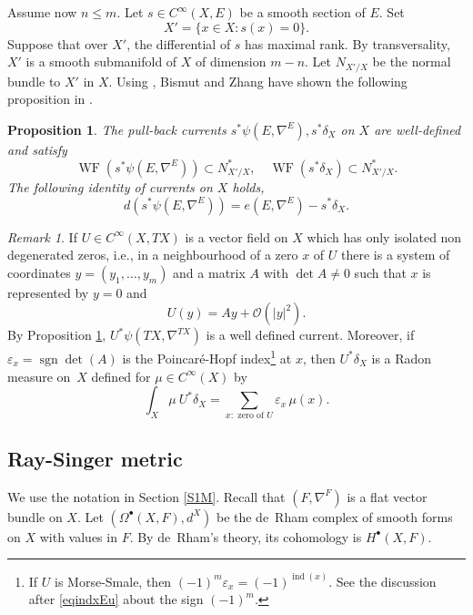 \documentclass[11pt]{article}
\newcommand{\ie}{i.e.,\xspace}
\numberwithin{equation}{section}
\newcommand{\sbullet}{{\scriptscriptstyle\bullet}}
\let\mathcal\mathscr
\theoremstyle{plain}
\newtheorem{prop}[lem]{Proposition}
\theoremstyle{definition}
\theoremstyle{remark}
\newtheorem{re}[lem]{Remark}
\newcommand{\cO}{\mathcal{O}}
\DeclareMathOperator{\ind}{ind}
\DeclareMathOperator{\sgn}{sgn}
\DeclareMathOperator{\WF}{WF}
\let\l\leqslant
\let\e\varepsilon
\begin{document}
Assume now $n\l m$. Let $s\in C^{\infty}(X,E)$ be a smooth section of $E$. Set
\begin{equation}\label{eqX0}
X'=\{x\in X:s(x)=0\}.
\end{equation}
Suppose that over $X'$, the differential of $s$ has maximal rank. By transversality,
$X'$ is a smooth submanifold of $X$ of dimension $m-n$. Let $N_{X'/X}$ be the normal bundle to $X'$ in $X$. Using \cite[Th.\,8.2.4]{HormanderBook1}, Bismut and Zhang have shown the following proposition in \cite[Rem.\,3.8]{BZ92}.

\begin{prop}\label{PropBZ38}
The pull-back currents $s^{*}\psi(E,\nabla^{E}),
s^{*}\delta_{X}$ on $X$ are well-defined and satisfy
\begin{equation}\label{eqWFsd}
\WF(s^{*}\psi(E,\nabla^{E}))\subset N_{X'/X}^{*},\quad\WF(s^{*}\delta_{X})\subset N^{*}_{X'/X}.
\end{equation}
The following identity of currents on $X$ holds,
\begin{equation}\label{eqsphi}
d(s^{*}\psi(E,\nabla^{E}))=e(E,\nabla^{E})-s^{*}\delta_{X}.
\end{equation}
\end{prop}

\begin{re}\label{reBZ38}
If $U\in C^{\infty}(X,TX)$ is a vector field on $X$ which has only isolated non degenerated
zeros, \ie in a neighbourhood of a zero $x$ of $U$ there is a
system of coordinates $y=(y_{1},\ldots,y_{m})$ and a matrix
$A$ with $\det
A\neq0$ such that $x$ is represented by $y=0$ and
\begin{equation*}\label{eqU=Ay}
U(y)=Ay+\cO(|y|^{2}).
\end{equation*}
By Proposition \ref{PropBZ38}, $U^{*}\psi(TX,\nabla^{TX})$ is a well
defined current. Moreover, if $\e_{x}=\sgn\det(A)$ is the Poincaré-Hopf
index\footnote{If $U$ is Morse-Smale, then $(-1)^{m}\e_{x}=(-1)^{\ind(x)}.$ See the discussion
after \eqref{eqindxEu} about the sign $(-1)^{m}$.} at $x$, then
$U^{*}\delta_{X}$ is a Radon measure on~$X$ defined for $\mu\in
C^{\infty}(X)$ by
\begin{equation}\label{eqUindd}
\int_{X}\mu \ U^{*}\delta_{X}=\sum_{x:\text{ zero of }U}\e_{x}\,\mu(x).
\end{equation}
\end{re}

\subsection{Ray-Singer metric}\label{sRS}
We use the notation in Section \ref{S1M}. Recall that $(F,\nabla^{F})$ is a flat vector bundle on $X$.
Let $(\Omega^{\sbullet}(X,F),d^{X})$ be the de~Rham complex of smooth
forms on $X$ with values in
$F$. By de~Rham's theory, its cohomology is $H^{\sbullet}(X,F)$.
\end{document}
